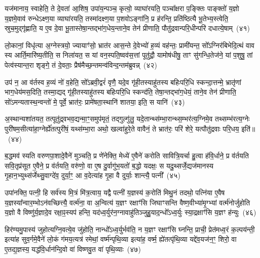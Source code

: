यज॑मानाय॒ स्वाहेति॒ ते दे॒वता॑ आ॒शिष॒ उपा॑य॒न्पञ्च॒ कृत्वो॒ व्याघा॑रयति॒ पञ्चा᳚क्षरा प॒ङ्क्तिः पाङ्क्तो॑ य॒ज्ञो य॒ज्ञमे॒वाव॑ रुन्धे\-ऽक्ष्ण॒या व्याघा॑रयति॒ तस्मा॑दक्ष्ण॒या प॒शवो\-ऽङ्गा॑नि॒ प्र ह॑रन्ति॒ प्रति॑ष्ठित्यै भू॒तेभ्य॒स्त्वेति॒ स्रुच॒मुद्गृ॑ह्णाति॒ य ए॒व दे॒वा भू॒तास्तेषा॒न्तद्भा॑ग॒धेय॒न्ताने॒व तेन॑ प्रीणाति॒ पौतु॑द्रवान्परि॒धीन्परि॑ दधात्ये॒षाम्~(४१)

लो॒कानां॒ विधृ॑त्या अ॒ग्नेस्त्रयो॒ ज्यायाꣳ॑सो॒ भ्रात॑र आस॒न्ते दे॒वेभ्यो॑ ह॒व्यं वह॑न्तः॒ प्रामी॑यन्त॒ सो᳚\-ऽग्निर॑बिभेदि॒त्थं वाव स्य आर्ति॒मारि॑ष्य॒तीति॒ स निला॑यत॒ स यां वन॒स्पति॒ष्वव॑स॒त्तां पूतु॑द्रौ॒ यामोष॑धीषु॒ ताꣳ सु॑गन्धि॒तेज॑ने॒ यां प॒शुषु॒ तां पेत्व॑स्यान्त॒रा शृङ्गे॒ तं दे॒वताः॒ प्रैष॑मैच्छ॒न्तमन्व॑विन्द॒न्तम॑ब्रुवन्न्~(४२)

उप॑ न॒ आ व॑र्तस्व ह॒व्यं नो॑ व॒हेति॒ सो᳚\-ऽब्रवी॒द्वरं॑ वृणै॒ यदे॒व गृ॑ही॒तस्याहु॑तस्य बहिःपरि॒धि स्कन्दा॒त्तन्मे॒ भ्रातृ॑णां भाग॒धेय॑मस॒दिति॒ तस्मा॒द्यद् गृ॑ही॒तस्याहु॑तस्य बहिःपरि॒धि स्कन्द॑ति॒ तेषा॒न्तद्भा॑ग॒धेयं॒ ताने॒व तेन॑ प्रीणाति॒ सो॑\-ऽमन्यतास्थ॒न्वन्तो॑ मे॒ पूर्वे॒ भ्रात॑रः॒ प्रामे॑षता॒स्थानि॑ शातया॒ इति॒ स यानि॑~(४३)

अ॒स्थान्यशा॑तयत॒ तत्पूतु॑द्र्वभव॒द्यन्मा॒ꣳ॒समुप॑मृतं॒ तद्गुल्गु॑लु॒ यदे॒तान्थ्स॑म्भा॒रान्थ्स॒म्भर॑त्य॒ग्निमे॒व तथ्सम्भ॑रत्य॒ग्नेः पुरी॑षम॒सीत्या॑हा॒ग्नेर्\mbox{}ह्ये॑तत्पुरी॑षं॒ यथ्स॑म्भा॒रा अथो॒ खल्वा॑हुरे॒ते वावैनं॒ ते भ्रात॑रः॒ परि॑ शेरे॒ यत्पौतु॑द्रवाः परि॒धय॒ इति॑॥~(४४)

{\anuvakamend[{वि॒त्त्वा दे॑वय॒त ए॒षाम॑ब्रुव॒न्॒ यानि॒ चतु॑श्चत्वारिꣳशच्च}]}%

ब॒द्धमव॑ स्यति वरुणपा॒शादे॒वैने॑ मुञ्चति॒ प्र णे॑नेक्ति॒ मेध्ये॑ ए॒वैने॑ करोति सावित्रि॒यर्चा हु॒त्वा ह॑वि॒र्धाने॒ प्र व॑र्तयति सवि॒तृप्र॑सूत ए॒वैने॒ प्र व॑र्तयति॒ वरु॑णो॒ वा ए॒ष दु॒र्वागु॑भ॒यतो॑ ब॒द्धो यदक्षः॒ स यदु॒थ्सर्जे॒द्यज॑मानस्य गृ॒हान॒भ्युथ्स॑र्जेथ्सु॒वाग्दे॑व॒ दुर्या॒ꣳ॒ आ व॒देत्या॑ह गृ॒हा वै दुर्याः॒ शान्त्यै॒ पत्नी᳚~(४५)

उपा॑नक्ति॒ पत्नी॒ हि सर्व॑स्य मि॒त्रं मि॑त्र॒त्वाय॒ यद्वै पत्नी॑ य॒ज्ञस्य॑ क॒रोति॑ मिथु॒नं तदथो॒ पत्नि॑या ए॒वैष य॒ज्ञस्या᳚न्वार॒म्भो\-ऽन॑वच्छित्त्यै॒ वर्त्म॑ना॒ वा अ॒न्वित्य॑ य॒ज्ञꣳ रक्षाꣳ॑सि जिघाꣳसन्ति वैष्ण॒वीभ्या॑मृ॒ग्भ्यां वर्त्म॑नोर्जुहोति य॒ज्ञो वै विष्णु॑र्य॒ज्ञादे॒व रक्षा॒ꣴ॒स्यप॑ हन्ति॒ यद॑ध्व॒र्युर॑न॒ग्नावाहु॑तिञ्जुहु॒याद॒न्धो᳚\-ऽध्व॒र्युः स्या॒द्रक्षाꣳ॑सि य॒ज्ञꣳ ह॑न्युः~(४६)

हिर॑ण्यमु॒पास्य॑ जुहोत्यग्नि॒वत्ये॒व जु॑होति॒ नान्धो᳚\-ऽध्व॒र्युर्भव॑ति॒ न य॒ज्ञꣳ रक्षाꣳ॑सि घ्नन्ति॒ प्राची॒ प्रेत॑मध्व॒रं क॒ल्पय॑न्ती॒ इत्या॑ह सुव॒र्गमे॒वैने॑ लो॒कं ग॑मय॒त्यत्र॑ रमेथां॒ वर्ष्म॑न्पृथि॒व्या इत्या॑ह॒ वर्ष्म॒ ह्ये॑तत्पृ॑थि॒व्या यद्दे॑व॒यज॑न॒ꣳ॒ शिरो॒ वा ए॒तद्य॒ज्ञस्य॒ यद्ध॑वि॒र्धान॑न्दि॒वो वा॑ विष्णवु॒त वा॑ पृथि॒व्याः~(४७)

